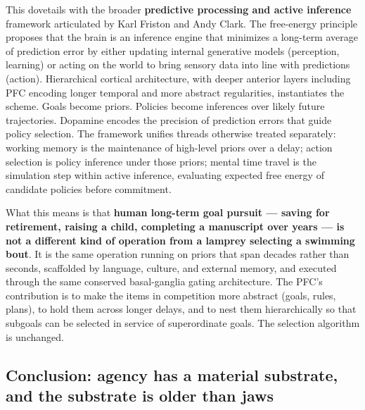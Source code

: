 This dovetails with the broader \textbf{predictive processing and active inference} framework articulated by Karl Friston and Andy Clark. The free-energy principle proposes that the brain is an inference engine that minimizes a long-term average of prediction error by either updating internal generative models (perception, learning) or acting on the world to bring sensory data into line with predictions (action). Hierarchical cortical architecture, with deeper anterior layers including PFC encoding longer temporal and more abstract regularities, instantiates the scheme. Goals become priors. Policies become inferences over likely future trajectories. Dopamine encodes the precision of prediction errors that guide policy selection. The framework unifies threads otherwise treated separately: working memory is the maintenance of high-level priors over a delay; action selection is policy inference under those priors; mental time travel is the simulation step within active inference, evaluating expected free energy of candidate policies before commitment.

What this means is that \textbf{human long-term goal pursuit --- saving for retirement, raising a child, completing a manuscript over years --- is not a different kind of operation from a lamprey selecting a swimming bout}. It is the same operation running on priors that span decades rather than seconds, scaffolded by language, culture, and external memory, and executed through the same conserved basal-ganglia gating architecture. The PFC's contribution is to make the items in competition more abstract (goals, rules, plans), to hold them across longer delays, and to nest them hierarchically so that subgoals can be selected in service of superordinate goals. The selection algorithm is unchanged.

\subsection{Conclusion: agency has a material substrate, and the substrate is older than jaws}\label{05_vertebrates-conclusion-agency-has-a-material-substrate-and-the-substrate-is-older-than-jaws}

